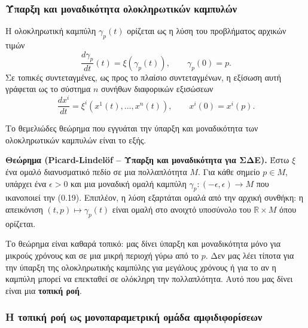 \documentclass[11pt,a4paper,twoside,openright]{book}
\begin{document}
\subsubsection{Ύπαρξη και μοναδικότητα ολοκληρωτικών καμπυλών}

Η ολοκληρωτική καμπύλη $\gamma_p(t)$ ορίζεται ως η λύση του προβλήματος αρχικών τιμών
\[
\frac{d\gamma_p}{dt}(t) = \xi(\gamma_p(t)), \qquad \gamma_p(0) = p. \tag{0.19}
\]
Σε τοπικές συντεταγμένες, ως προς το πλαίσιο συντεταγμένων, η εξίσωση αυτή γράφεται ως το σύστημα $n$ συνήθων διαφορικών εξισώσεων
\[
\frac{dx^i}{dt} = \xi^i(x^1(t), \dots, x^n(t)), \qquad x^i(0) = x^i(p). \tag{0.20}
\]

Το θεμελιώδες θεώρημα που εγγυάται την ύπαρξη και μοναδικότητα των ολοκληρωτικών καμπυλών είναι το εξής.

\textbf{Θεώρημα (Picard-Lindelöf – Ύπαρξη και μοναδικότητα για ΣΔΕ).} Έστω $\xi$ ένα ομαλό διανυσματικό πεδίο σε μια πολλαπλότητα $M$. Για κάθε σημείο $p \in M$, υπάρχει ένα $\epsilon > 0$ και μια μοναδική ομαλή καμπύλη $\gamma_p: (-\epsilon, \epsilon) \to M$ που ικανοποιεί την (0.19). Επιπλέον, η λύση εξαρτάται ομαλά από την αρχική συνθήκη: η απεικόνιση $(t, p) \mapsto \gamma_p(t)$ είναι ομαλή στο ανοιχτό υποσύνολο του $\mathbb{R} \times M$ όπου ορίζεται.

Το θεώρημα είναι καθαρά τοπικό: μας δίνει ύπαρξη και μοναδικότητα μόνο για μικρούς χρόνους και σε μια μικρή περιοχή γύρω από το $p$. Δεν μας λέει τίποτα για την ύπαρξη της ολοκληρωτικής καμπύλης για μεγάλους χρόνους ή για το αν η καμπύλη μπορεί να επεκταθεί σε ολόκληρη την πολλαπλότητα. Αυτό που μας δίνει είναι μια \textbf{τοπική ροή}.

\subsubsection{Η τοπική ροή ως μονοπαραμετρική ομάδα αμφιδιφορίσεων}
\end{document}
